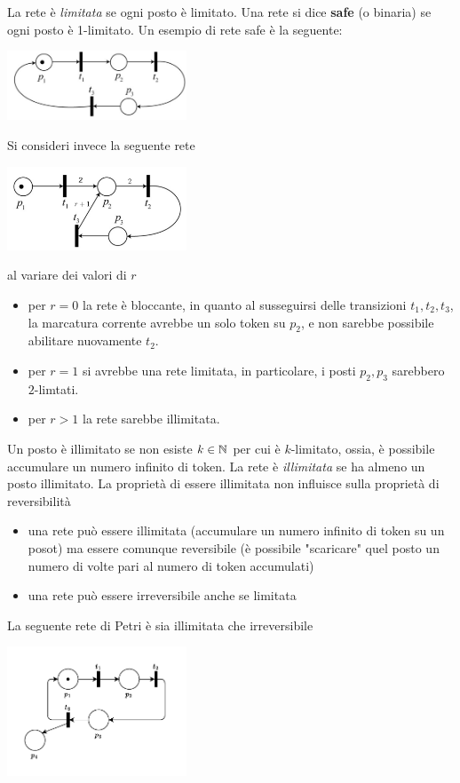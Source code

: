 \documentclass[10pt, letterpaper]{report}
\begin{document}
La rete è \textit{limitata} se ogni posto è limitato. Una rete si dice \textbf{safe} (o binaria) se ogni posto è 1-limitato.
Un esempio di rete safe è la seguente:
\begin{center}
    \includegraphics[width=0.4\textwidth]{images/safe.png}
\end{center}
Si consideri invece la seguente rete
\begin{center}
    \includegraphics[width=0.4\textwidth]{images/limitata.png}
\end{center}
al variare dei valori di $r$\begin{itemize}
    \item per $r=0$ la rete è bloccante, in quanto al susseguirsi delle transizioni $t_1,t_2,t_3$, la marcatura corrente avrebbe un solo token su $p_2$, e non sarebbe possibile abilitare nuovamente $t_2$.
    \item per $r=1$ si avrebbe una rete limitata, in particolare, i posti $p_2,p_3$ sarebbero $2$-limtati.
    \item per $r>1$ la rete sarebbe illimitata.
\end{itemize}
Un posto è illimitato se non esiste $k\in{\mathbb N}$ per cui è $k$-limitato, ossia, è possibile accumulare un numero infinito di token. La rete è \textit{illimitata} se ha almeno un posto illimitato.\acc 
La proprietà di essere illimitata non influisce sulla proprietà di reversibilità\begin{itemize}
    \item una rete può essere illimitata (accumulare un numero infinito di token su un posot) ma essere comunque reversibile (è possibile "scaricare" quel posto un numero di volte pari al numero di token accumulati)
    \item una rete può essere irreversibile anche se limitata
\end{itemize}
La seguente rete di Petri è sia illimitata che irreversibile
\begin{center}
    \includegraphics[width=0.4\textwidth]{images/illimitata.drawio.pdf}
\end{center}
\end{document}
